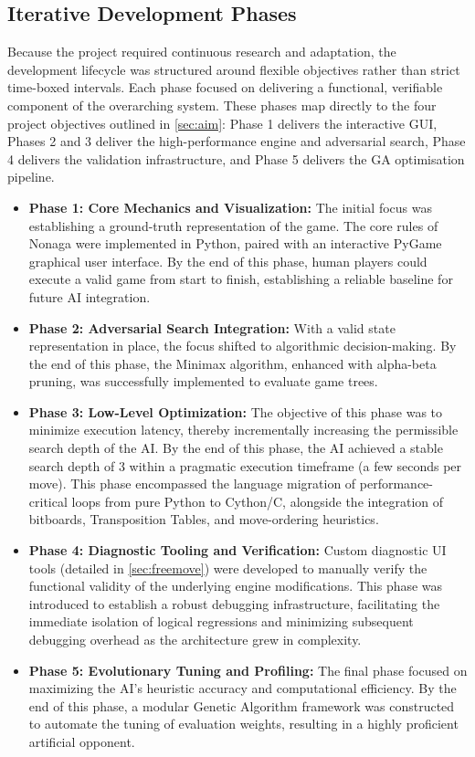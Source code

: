 \subsection{Iterative Development Phases}

Because the project required continuous research and adaptation, the development lifecycle was structured around flexible objectives rather than strict time-boxed intervals. Each phase focused on delivering a functional, verifiable component of the overarching system. These phases map directly to the four project objectives outlined in \cref{sec:aim}: Phase 1 delivers the interactive GUI, Phases 2 and 3 deliver the high-performance engine and adversarial search, Phase 4 delivers the validation infrastructure, and Phase 5 delivers the GA optimisation pipeline.

\begin{itemize}
  \item \textbf{Phase 1: Core Mechanics and Visualization:} The initial focus was establishing a ground-truth representation of the game. The core rules of Nonaga were implemented in Python, paired with an interactive PyGame graphical user interface. By the end of this phase, human players could execute a valid game from start to finish, establishing a reliable baseline for future AI integration.

  \item \textbf{Phase 2: Adversarial Search Integration:} With a valid state representation in place, the focus shifted to algorithmic decision-making. By the end of this phase, the Minimax algorithm, enhanced with alpha-beta pruning, was successfully implemented to evaluate game trees.

  \item \textbf{Phase 3: Low-Level Optimization:} The objective of this phase was to minimize execution latency, thereby incrementally increasing the permissible search depth of the AI. By the end of this phase, the AI achieved a stable search depth of 3 within a pragmatic execution timeframe (a few seconds per move). This phase encompassed the language migration of performance-critical loops from pure Python to Cython/C, alongside the integration of bitboards, Transposition Tables, and move-ordering heuristics.

  \item \textbf{Phase 4: Diagnostic Tooling and Verification:} Custom diagnostic UI tools (detailed in \cref{sec:freemove}) were developed to manually verify the functional validity of the underlying engine modifications. This phase was introduced to establish a robust debugging infrastructure, facilitating the immediate isolation of logical regressions and minimizing subsequent debugging overhead as the architecture grew in complexity.

  \item \textbf{Phase 5: Evolutionary Tuning and Profiling:} The final phase focused on maximizing the AI's heuristic accuracy and computational efficiency. By the end of this phase, a modular Genetic Algorithm framework was constructed to automate the tuning of evaluation weights, resulting in a highly proficient artificial opponent.
\end{itemize}

